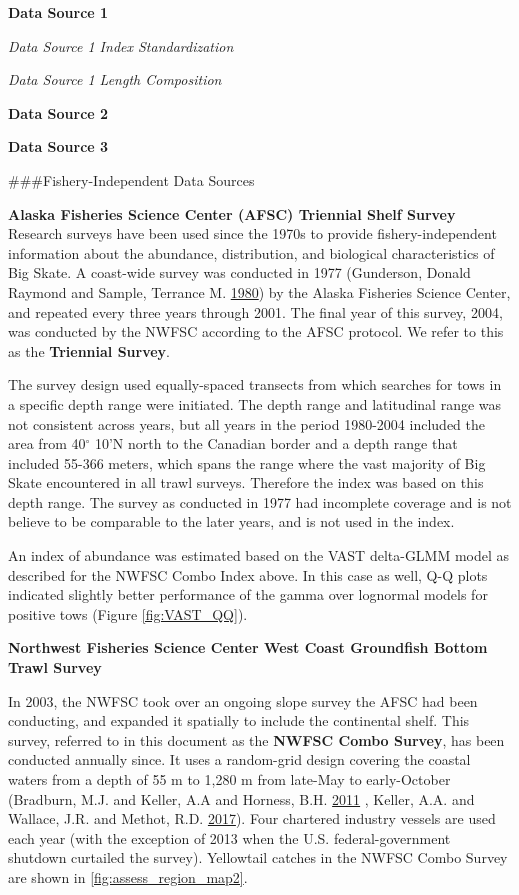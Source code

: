 \documentclass[12pt,]{article}
\begin{document}
\textbf{Data Source 1}

\emph{Data Source 1 Index Standardization}

\emph{Data Source 1 Length Composition}

\textbf{Data Source 2}

\textbf{Data Source 3}

\#\#\#Fishery-Independent Data Sources

\textbf{Alaska Fisheries Science Center (AFSC) Triennial Shelf Survey}\\
Research surveys have been used since the 1970s to provide
fishery-independent information about the abundance, distribution, and
biological characteristics of Big Skate. A coast-wide survey was
conducted in 1977 (Gunderson, Donald Raymond and Sample, Terrance M.
\protect\hyperlink{ref-Gunderson1980}{1980}) by the Alaska Fisheries
Science Center, and repeated every three years through 2001. The final
year of this survey, 2004, was conducted by the NWFSC according to the
AFSC protocol. We refer to this as the \textbf{Triennial Survey}.

The survey design used equally-spaced transects from which searches for
tows in a specific depth range were initiated. The depth range and
latitudinal range was not consistent across years, but all years in the
period 1980-2004 included the area from 40\(^\circ\) 10'N north to the
Canadian border and a depth range that included 55-366 meters, which
spans the range where the vast majority of Big Skate encountered in all
trawl surveys. Therefore the index was based on this depth range. The
survey as conducted in 1977 had incomplete coverage and is not believe
to be comparable to the later years, and is not used in the index.

An index of abundance was estimated based on the VAST delta-GLMM model
as described for the NWFSC Combo Index above. In this case as well, Q-Q
plots indicated slightly better performance of the gamma over lognormal
models for positive tows (Figure \ref{fig:VAST_QQ}).

\textbf{Northwest Fisheries Science Center West Coast Groundfish Bottom
Trawl Survey}

In 2003, the NWFSC took over an ongoing slope survey the AFSC had been
conducting, and expanded it spatially to include the continental shelf.
This survey, referred to in this document as the \textbf{NWFSC Combo
Survey}, has been conducted annually since. It uses a random-grid design
covering the coastal waters from a depth of 55 m to 1,280 m from
late-May to early-October (Bradburn, M.J. and Keller, A.A and Horness,
B.H. \protect\hyperlink{ref-Bradburn2011}{2011} , Keller, A.A. and
Wallace, J.R. and Methot, R.D.
\protect\hyperlink{ref-Keller2017}{2017}). Four chartered industry
vessels are used each year (with the exception of 2013 when the U.S.
federal-government shutdown curtailed the survey). Yellowtail catches in
the NWFSC Combo Survey are shown in \ref{fig:assess_region_map2}.
\end{document}
